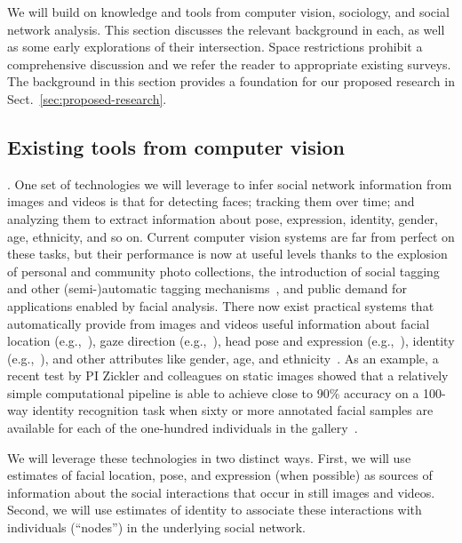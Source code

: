 
We will build on knowledge and tools from computer vision, sociology, and social network analysis. This section discusses the relevant background in each, as well as some early explorations of their intersection. Space restrictions prohibit a comprehensive discussion and we refer the reader to appropriate existing surveys. The background in this section provides a foundation for our proposed research in Sect.~\ref{sec:proposed-research}.

\subsection{Existing tools from computer vision}

. One set of technologies we will leverage to infer social network information from images and videos is that for detecting faces; tracking them over time; and analyzing them to extract information about pose, expression, identity, gender, age, ethnicity, and so on.  Current computer vision systems are  far from perfect on these tasks, but their performance is now at useful levels thanks to the explosion of personal and community photo collections, the introduction of social tagging~\cite{Stone2008,Stone2010} and other (semi-)automatic tagging mechanisms~\cite{berg2004naf,berg2005sp,Everingham06a,huang:lfw,YangBKR12}, and public demand for applications enabled by facial analysis. There now exist practical systems that automatically provide from images and videos useful information about facial location (e.g.,~\cite{ViolaJones,Zhang:detect,Comaniciu:track}), gaze direction (e.g.,~\cite{Hanson}), head pose and expression (e.g.,~\cite{Murphy-Chutorian:pose,Matthews:AAM,Lucey:AAM,Mumford:face,Yacoob:expression,delaTorre:expression,Essa:expression,huang:lfw,HolubMoreelsPeronaFG08}), identity (e.g.,~\cite{Chellappa:face}), and other attributes like gender, age, and ethnicity~\cite{LNCS53050340}. As  an example, a recent test by PI Zickler and colleagues on static images showed that a relatively simple computational pipeline is able to achieve close to 90\% accuracy on a 100-way identity recognition task when sixty or more annotated facial samples are available for each of the one-hundred individuals in the gallery~\cite{PintoZickler2011}. 

We will leverage these technologies in two distinct ways. First, we will use estimates of facial location, pose, and expression (when possible) as sources of information about the social interactions that occur in still images and videos. Second, we will use estimates of identity to associate these interactions with individuals (``nodes'') in the underlying social network. 


